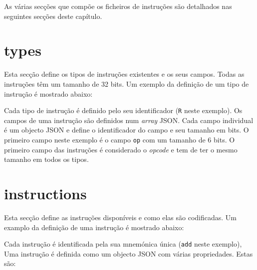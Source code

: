 \documentclass[11pt,a4paper,twoside,titlepage]{report}
\begin{document}


As várias secções que compõe os ficheiros de instruções são detalhados nas
seguintes secções deste capítulo.


\section{types}

Esta secção define os tipos de instruções existentes e os seus campos.
Todas as instruções têm um tamanho de 32 bits.
Um exemplo da definição de um tipo de instrução é mostrado abaixo:



Cada tipo de instrução é definido pelo seu identificador (\verb+R+ neste exemplo).
Os campos de uma instrução são definidos num \emph{array} JSON. Cada campo
individual é um objecto JSON e define o identificador do campo e seu tamanho em
bits. O primeiro campo neste exemplo é o campo \verb+op+ com um tamanho de 6 bits.
O primeiro campo das instruções é considerado o \emph{opcode} e tem de ter o
mesmo tamanho em todos os tipos.


\section{instructions}

Esta secção define as instruções disponíveis e como elas são codificadas.
Um examplo da definição de uma instrução é mostrado abaixo:



Cada instrução é identificada pela sua mnemónica única (\verb+add+ neste exemplo),
Uma instrução é definida como um objecto JSON com várias propriedades. Estas são:
\end{document}
